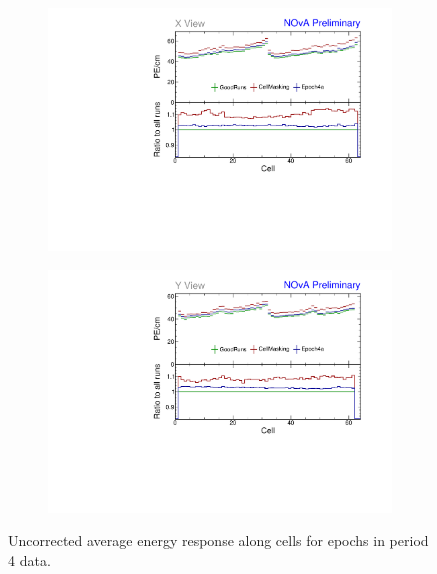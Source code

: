 \begin{figure}[!hbtp]
\centering
\begin{subfigure}[b]{0.495\textwidth}
\centering
\includegraphics[width=\textwidth]{Plots/TBCalibration/Attenprofs_P4Data_CellPE_X_Combined.pdf}
\end{subfigure}
\begin{subfigure}[b]{0.495\textwidth}
\centering
\includegraphics[width=\textwidth]{Plots/TBCalibration/Attenprofs_P4Data_CellPE_Y_Combined.pdf}
\end{subfigure}
\caption{Uncorrected average energy response along cells for epochs in period 4 data.}
\label{fig:CalibhistCellPE_period4}
\end{figure}

